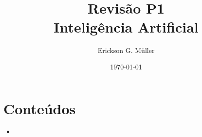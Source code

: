 \documentclass[ ]{article}
\title{Revisão P1\\Inteligência Artificial}
\author{Erickson G. Müller}
\date{\today}
\begin{document}
\maketitle

\section*{Conteúdos}
	\begin{itemize}
		\item
	\end{itemize}
	
\section{}
\end{document}
